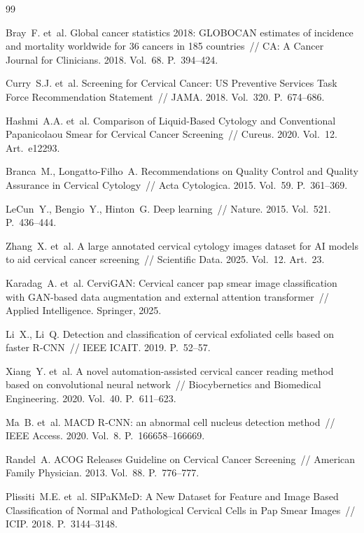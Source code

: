 \documentclass[14pt,a4paper]{extreport}
\begin{document}
\renewcommand{\bibname}{References}
\begin{thebibliography}{99}

Bray~F. et~al. Global cancer statistics 2018: GLOBOCAN estimates of
incidence and mortality worldwide for 36 cancers in 185 countries~//
CA: A Cancer Journal for Clinicians. 2018. Vol.~68. P.~394--424.

Curry~S.J. et~al. Screening for Cervical Cancer: US Preventive Services
Task Force Recommendation Statement~// JAMA. 2018. Vol.~320. P.~674--686.

Hashmi~A.A. et~al. Comparison of Liquid-Based Cytology and Conventional
Papanicolaou Smear for Cervical Cancer Screening~// Cureus. 2020.
Vol.~12. Art.~e12293.

Branca~M., Longatto-Filho~A. Recommendations on Quality Control and
Quality Assurance in Cervical Cytology~// Acta Cytologica. 2015.
Vol.~59. P.~361--369.

LeCun~Y., Bengio~Y., Hinton~G. Deep learning~// Nature. 2015. Vol.~521.
P.~436--444.

Zhang~X. et~al. A large annotated cervical cytology images dataset for
AI models to aid cervical cancer screening~// Scientific Data. 2025.
Vol.~12. Art.~23.

Karadag~A. et~al. CerviGAN: Cervical cancer pap smear image classification
with GAN-based data augmentation and external attention transformer~//
Applied Intelligence. Springer, 2025.

Li~X., Li~Q. Detection and classification of cervical exfoliated cells
based on faster R-CNN~// IEEE ICAIT. 2019. P.~52--57.

Xiang~Y. et~al. A novel automation-assisted cervical cancer reading method
based on convolutional neural network~// Biocybernetics and Biomedical
Engineering. 2020. Vol.~40. P.~611--623.

Ma~B. et~al. MACD R-CNN: an abnormal cell nucleus detection method~//
IEEE Access. 2020. Vol.~8. P.~166658--166669.

Randel~A. ACOG Releases Guideline on Cervical Cancer Screening~//
American Family Physician. 2013. Vol.~88. P.~776--777.

Plissiti~M.E. et~al. SIPaKMeD: A New Dataset for Feature and Image Based
Classification of Normal and Pathological Cervical Cells in Pap Smear
Images~// ICIP. 2018. P.~3144--3148.


\end{thebibliography}
\end{document}
